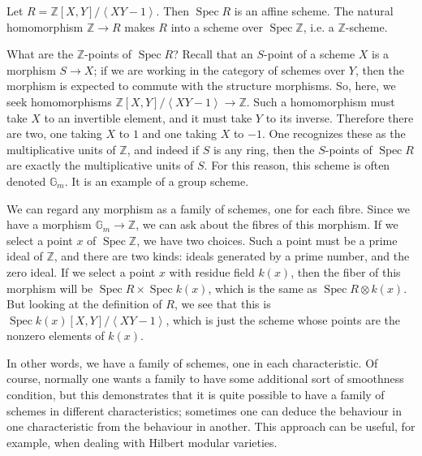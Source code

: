 \documentclass[12pt]{article}
\DeclareMathOperator{\Spec}{Spec}
\begin{document}
Let $R=\mathbb{Z}[X,Y]/\left<XY-1\right>$.  Then $\Spec R$ is an affine scheme.  The natural homomorphism $\mathbb{Z}\to R$ makes $R$ into a scheme over $\Spec \mathbb{Z}$, i.e. a $\mathbb{Z}$-scheme.  

What are the $\mathbb{Z}$-points of $\Spec R$? Recall that an $S$-point of a scheme  $X$ is a morphism $S\to X$; if we are working in the category of schemes over $Y$, then the morphism is expected to commute with the structure morphisms.  So, here, we seek homomorphisms $\mathbb{Z}[X,Y]/\left<XY-1\right> \to \mathbb{Z}$. Such a homomorphism must take $X$ to an invertible element, and it must take $Y$ to its inverse.  Therefore there are two, one taking $X$ to $1$ and one taking $X$ to $-1$. One recognizes these as the multiplicative units of $\mathbb{Z}$, and indeed if $S$ is any ring, then the $S$-points of $\Spec R$ are exactly the multiplicative units of $S$.  For this reason, this scheme is often denoted $\mathbb{G}_m$. It is an example of a group scheme. 

We can regard any morphism as a family of schemes, one for each fibre.
Since we have a morphism $\mathbb{G}_m \to \mathbb{Z}$, we can ask about the fibres of this morphism.  If we select a point $x$ of $\Spec \mathbb{Z}$, we have two choices. Such a point must be a prime ideal of $\mathbb{Z}$, and there are two kinds: ideals generated by a prime number, and the zero ideal. If we select a point $x$ with residue field $k(x)$, then the fiber of this morphism will be $\Spec R \times \Spec k(x)$, which is the same as $\Spec R\otimes k(x)$. But looking at the definition of $R$, we see that this is $\Spec k(x)[X,Y]/\left<XY-1\right>$, which is just the scheme whose points are the nonzero elements of $k(x)$.  

In other words, we have a family of schemes, one in each characteristic.  Of course, normally one wants a family to have some additional sort of smoothness condition, but this demonstrates that it is quite possible to have a family of schemes in different characteristics; sometimes one can deduce the behaviour in one characteristic from the behaviour in another.  This approach can be useful, for example, when dealing with Hilbert modular varieties.
\end{document}
